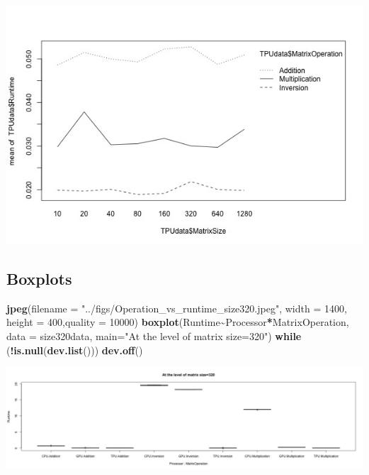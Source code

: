 \documentclass[
]{article}
\newenvironment{Shaded}{\begin{snugshade}}{\end{snugshade}}
\newcommand{\ControlFlowTok}[1]{\textcolor[rgb]{0.13,0.29,0.53}{\textbf{#1}}}
\newcommand{\DataTypeTok}[1]{\textcolor[rgb]{0.13,0.29,0.53}{#1}}
\newcommand{\DecValTok}[1]{\textcolor[rgb]{0.00,0.00,0.81}{#1}}
\newcommand{\KeywordTok}[1]{\textcolor[rgb]{0.13,0.29,0.53}{\textbf{#1}}}
\newcommand{\NormalTok}[1]{#1}
\newcommand{\OperatorTok}[1]{\textcolor[rgb]{0.81,0.36,0.00}{\textbf{#1}}}
\newcommand{\StringTok}[1]{\textcolor[rgb]{0.31,0.60,0.02}{#1}}
\begin{document}
\begin{center}\includegraphics[width=0.9\linewidth]{../figs/interaction_TPU_size_time} \end{center}

\hypertarget{boxplots}{%
\subsection{Boxplots}\label{boxplots}}

\begin{Shaded}
\begin{Highlighting}[]
\KeywordTok{jpeg}\NormalTok{(}\DataTypeTok{filename =} \StringTok{"../figs/Operation\_vs\_runtime\_size320.jpeg"}\NormalTok{, }\DataTypeTok{width =} \DecValTok{1400}\NormalTok{, }\DataTypeTok{height =} \DecValTok{400}\NormalTok{,}\DataTypeTok{quality =} \DecValTok{10000}\NormalTok{)}
\KeywordTok{boxplot}\NormalTok{(Runtime}\OperatorTok{\textasciitilde{}}\NormalTok{Processor}\OperatorTok{*}\NormalTok{MatrixOperation, }\DataTypeTok{data =}\NormalTok{ size320data, }\DataTypeTok{main=}\StringTok{"At the level of matrix size=320"}\NormalTok{)}
\ControlFlowTok{while}\NormalTok{ (}\OperatorTok{!}\KeywordTok{is.null}\NormalTok{(}\KeywordTok{dev.list}\NormalTok{()))  }\KeywordTok{dev.off}\NormalTok{()}
\end{Highlighting}
\end{Shaded}

\begin{center}\includegraphics[width=0.9\linewidth]{../figs/Operation_vs_runtime_size320} \end{center}
\end{document}
